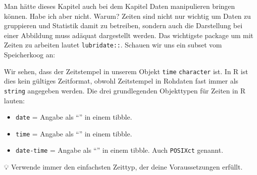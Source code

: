 \documentclass[
]{article}
\newenvironment{Shaded}{\begin{snugshade}}{\end{snugshade}}
\newcommand{\AttributeTok}[1]{\textcolor[rgb]{0.77,0.63,0.00}{#1}}
\newcommand{\DecValTok}[1]{\textcolor[rgb]{0.00,0.00,0.81}{#1}}
\newcommand{\DocumentationTok}[1]{\textcolor[rgb]{0.56,0.35,0.01}{\textbf{\textit{#1}}}}
\newcommand{\FunctionTok}[1]{\textcolor[rgb]{0.00,0.00,0.00}{#1}}
\newcommand{\NormalTok}[1]{#1}
\newcommand{\OtherTok}[1]{\textcolor[rgb]{0.56,0.35,0.01}{#1}}
\newcommand{\SpecialCharTok}[1]{\textcolor[rgb]{0.00,0.00,0.00}{#1}}
\newcommand{\StringTok}[1]{\textcolor[rgb]{0.31,0.60,0.02}{#1}}
\providecommand{\tightlist}{%
  \setlength{\itemsep}{0pt}\setlength{\parskip}{0pt}}
\begin{document}
Man hätte dieses Kapitel auch bei dem Kapitel Daten manipulieren bringen können. Habe ich aber nicht. Warum? Zeiten sind nicht nur wichtig um Daten zu gruppieren und Statistik damit zu betreiben, sondern auch die Darstellung bei einer Abbildung muss adäquat dargestellt werden. Das wichtigste package um mit Zeiten zu arbeiten lautet \texttt{lubridate::}. Schauen wir uns ein subset vom Speicherkoog an:

\begin{Shaded}
\end{Shaded}

Wir sehen, dass der Zeitstempel in unserem Objekt \texttt{time} \texttt{character} ist. In R ist dies kein gültiges Zeitformat, obwohl Zeitstempel in Rohdaten fast immer als \texttt{string} angegeben werden. Die drei grundlegenden Objekttypen für Zeiten in R lauten:

\begin{itemize}
\tightlist
\item
  \texttt{date} = Angabe als ``'' in einem tibble.
\item
  \texttt{time} = Angabe als ``'' in einem tibble.
\item
  \texttt{date-time} = Angabe als ``'' in einem tibble. Auch \texttt{POSIXct} genannt.
\end{itemize}

💡 Verwende immer den einfachsten Zeittyp, der deine Voraussetzungen erfüllt.
\end{document}
